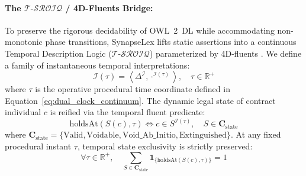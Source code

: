 \documentclass[11pt,a4paper]{article}
\begin{document}
\paragraph{The $\mathcal{T}\text{-}\mathcal{SROIQ}$ / 4D-Fluents Bridge:}
To preserve the rigorous decidability of OWL~2~DL while accommodating non-monotonic phase transitions, SynapseLex lifts static assertions into a continuous Temporal Description Logic ($\mathcal{T}\text{-}\mathcal{SROIQ}$) parameterized by 4D-fluents \citep{welty2006formal, batsakis20114d, artale2005temporal}. We define a family of instantaneous temporal interpretations:
\begin{equation}
\mathcal{I}(\tau) = \left\langle \Delta^\mathcal{I}, \cdot^{\mathcal{I}(\tau)} \right\rangle, \quad \tau \in \mathbb{R}^+
\end{equation}
where $\tau$ is the operative procedural time coordinate defined in Equation~\eqref{eq:dual_clock_continuum}. The dynamic legal state of contract individual $c$ is reified via the temporal fluent predicate:
\begin{equation}
\mathrm{holdsAt}(S(c), \tau) \iff c \in S^{\mathcal{I}(\tau)}, \quad S \in \mathbf{C}_{\text{state}}
\end{equation}
where $\mathbf{C}_{\text{state}} = \{\text{Valid}, \text{Voidable}, \text{Void\_Ab\_Initio}, \text{Extinguished}\}$. At any fixed procedural instant $\tau$, temporal state exclusivity is strictly preserved:
\begin{equation}
\label{eq:state_exclusivity}
\forall \tau \in \mathbb{R}^+, \quad \sum_{S \in \mathbf{C}_{\text{state}}} \mathbf{1}_{\{ \mathrm{holdsAt}(S(c), \tau) \}} = 1
\end{equation}
\end{document}
